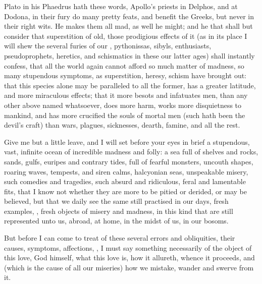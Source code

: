 {Plato in his Phaedrus hath these words, Apollo's priests in
Delphos, and at Dodona, in their fury do many pretty feats, and benefit
the Greeks, but never in their right wits. He makes them all mad, as
well he might; and he that shall but consider that superstition of old,
those prodigious effects of it (as in its place I will shew the several
furies of our , pythonissas, sibyls, enthusiasts,
pseudoprophets, heretics, and schismatics in these our latter ages)
shall instantly confess, that all the world again cannot afford so much
matter of madness, so many stupendous symptoms, as superstition,
heresy, schism have brought out: that this species alone may be
paralleled to all the former, has a greater latitude, and more
miraculous effects; that it more besots and infatuates men, than any
other above named whatsoever, does more harm, works more disquietness
to mankind, and has more crucified the souls of mortal men (such hath
been the devil's craft) than wars, plagues, sicknesses, dearth, famine,
and all the rest.

Give me but a little leave, and I will set before your eyes in brief a
stupendous, vast, infinite ocean of incredible madness and folly: a sea
full of shelves and rocks, sands, gulfs, euripes and contrary tides,
full of fearful monsters, uncouth shapes, roaring waves, tempests, and
siren calms, halcyonian seas, unspeakable misery, such comedies and
tragedies, such absurd and ridiculous, feral and lamentable fits, that
I know not whether they are more to be pitied or derided, or may be
believed, but that we daily see the same still practised in our days,
fresh examples, , fresh objects of misery and madness, in
this kind that are still represented unto us, abroad, at home, in the
midst of us, in our bosoms.

But before I can come to treat of these several errors and obliquities,
their causes, symptoms, affections, \etc{}, I must say something
necessarily of the object of this love, God himself, what this love is,
how it allureth, whence it proceeds, and (which is the cause of all our
miseries) how we mistake, wander and swerve from it.

}
